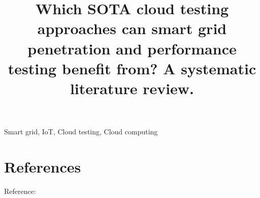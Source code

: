 \documentclass[conference]{biblio/IEEEtran}
\begin{document}
\title{Which SOTA cloud testing approaches can smart grid penetration and performance testing benefit from? A systematic literature review.\\}

\author{
}


\maketitle


\begin{IEEEkeywords}
Smart grid, IoT, Cloud testing, Cloud computing
\end{IEEEkeywords}




%


 

\section*{References}

Reference: \cite{salome-test}




\vspace{12pt}
\end{document}
